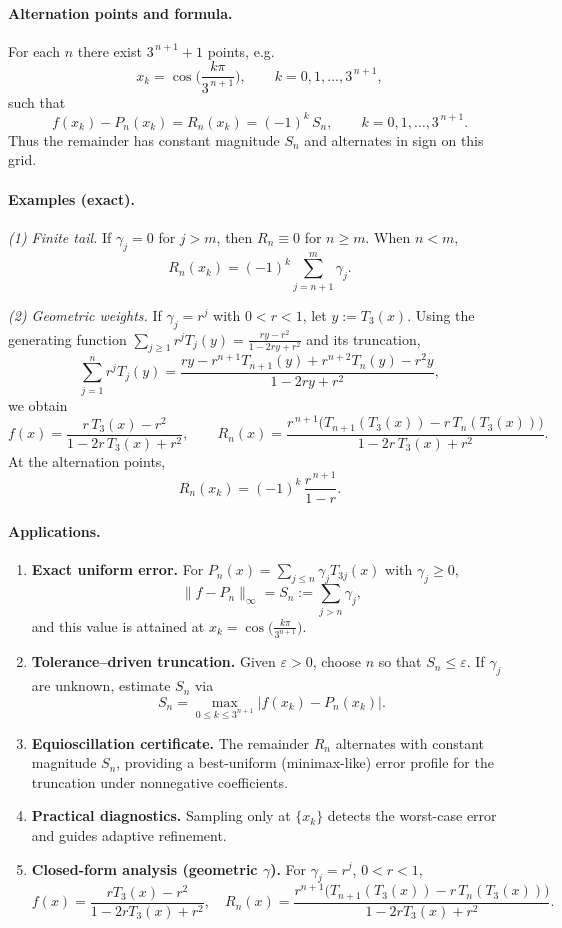\documentclass[12pt,a4paper]{article}
\theoremstyle{plain}
\theoremstyle{definition}
\theoremstyle{remark}
\theoremstyle{remark}
\begin{document}
\paragraph{Alternation points and formula.}
For each $n$ there exist $3^{\,n+1}\!+\!1$ points, e.g.
\[
x_k=\cos\!\Big(\frac{k\pi}{3^{\,n+1}}\Big),\qquad k=0,1,\dots,3^{\,n+1},
\]
such that
\[
\boxed{ \quad f(x_k)-P_n(x_k)=R_n(x_k)=(-1)^k\,S_n,\qquad k=0,1,\dots,3^{\,n+1}. \quad}
\]
Thus the remainder has constant magnitude $S_n$ and alternates in sign on this grid.

\paragraph{Examples (exact).}

\emph{(1) Finite tail.}
If $\gamma_j=0$ for $j>m$, then $R_n\equiv 0$ for $n\ge m$.
When $n<m$,
\[
R_n(x_k)=(-1)^k\sum_{j=n+1}^{m}\gamma_j .
\]

\emph{(2) Geometric weights.}
If $\gamma_j=r^j$ with $0<r<1$, let $y:=T_3(x)$.
Using the generating function $\sum_{j\ge 1} r^j T_j(y)=\frac{r y-r^2}{1-2 r y+r^2}$ and its
truncation,
\[
\sum_{j=1}^{n} r^{j}T_j(y)
=\frac{r y - r^{n+1}T_{n+1}(y) + r^{n+2}T_n(y) - r^2 y}{1-2r y+r^2},
\]
we obtain
\[
f(x)=\frac{r\,T_3(x)-r^2}{1-2r\,T_3(x)+r^2},\qquad
R_n(x)=\frac{r^{\,n+1}\big(T_{n+1}(T_3(x)) - r\,T_n(T_3(x))\big)}{1-2r\,T_3(x)+r^2}.
\]
At the alternation points,
\[
R_n(x_k)=(-1)^k\,\frac{r^{\,n+1}}{1-r}.
\]
	
	\paragraph{Applications.}
\begin{enumerate}[label=(\alph*), leftmargin=*]
	\item \textbf{Exact uniform error.}
	For $P_n(x)=\sum_{j\le n}\gamma_j T_{3j}(x)$ with $\gamma_j\ge 0$,
	\[
	\|f-P_n\|_\infty = S_n:=\sum_{j>n}\gamma_j,
	\]
	and this value is attained at $x_k=\cos\!\big(\tfrac{k\pi}{3^{n+1}}\big)$.
	
	\item \textbf{Tolerance–driven truncation.}
	Given $\varepsilon>0$, choose $n$ so that $S_n\le \varepsilon$. If $\gamma_j$ are unknown,
	estimate $S_n$ via
	\[
	S_n = \max_{0\le k\le 3^{n+1}} |f(x_k)-P_n(x_k)|.
	\]
	
	\item \textbf{Equioscillation certificate.}
	The remainder $R_n$ alternates with constant magnitude $S_n$, providing a best-uniform
	(minimax-like) error profile for the truncation under nonnegative coefficients.
	
	\item \textbf{Practical diagnostics.}
	Sampling only at $\{x_k\}$ detects the worst-case error and guides adaptive refinement.
	
	\item \textbf{Closed-form analysis (geometric $\gamma$).}
	For $\gamma_j=r^j$, $0<r<1$,
	\[
	f(x)=\frac{rT_3(x)-r^2}{1-2rT_3(x)+r^2},\quad
	R_n(x)=\frac{r^{n+1}\big(T_{n+1}(T_3(x))-r\,T_n(T_3(x))\big)}{1-2rT_3(x)+r^2}.
	\]
\end{enumerate}
	
\end{document}
